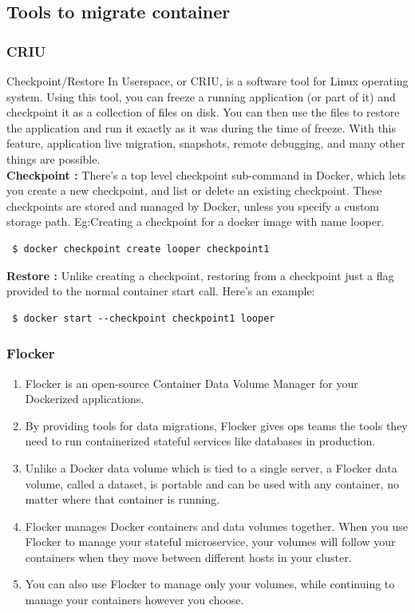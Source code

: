 \documentclass[a4paper,12pt]{article}
\begin{document}
\subsection{Tools to migrate container}
\subsubsection{CRIU}
Checkpoint/Restore In Userspace, or CRIU, is a software tool for Linux operating system. Using this tool, you can freeze a running application (or part of it) and checkpoint it as a collection of files on disk. You can then use the files to restore the application and run it exactly as it was during the time of freeze. With this feature, application live migration, snapshots, remote debugging, and many other things are possible.\\
\textbf{Checkpoint :}
There's a top level checkpoint sub-command in Docker, which lets you create a new checkpoint, and list or delete an existing checkpoint. These checkpoints are stored and managed by Docker, unless you specify a custom storage path.
Eg:Creating a checkpoint for a docker image with name looper.\\
\begin{verbatim} $ docker checkpoint create looper checkpoint1 \end{verbatim} 
\textbf{Restore :}
Unlike creating a checkpoint, restoring from a checkpoint just a flag provided to the normal container start call. Here's an example:\\
\begin{verbatim} $ docker start --checkpoint checkpoint1 looper \end{verbatim}

\subsubsection{Flocker}
\begin{enumerate}

\item Flocker is an open-source Container Data Volume Manager for your Dockerized applications. 

\item  By providing tools for data migrations, Flocker gives ops teams the tools they need to run containerized stateful services like databases in production. 

\item  Unlike a Docker data volume which is tied to a single server, a Flocker data volume, called a dataset, is portable and can be used with any container, no matter where that container is running. 
 
\item Flocker manages Docker containers and data volumes together. When you use Flocker to manage your stateful microservice, your volumes will follow your containers when they move between different hosts in your cluster. 

\item You can also use Flocker to manage only your volumes, while continuing to manage your containers however you choose.\cite{dkbbd}
\end{enumerate}
\end{document}
